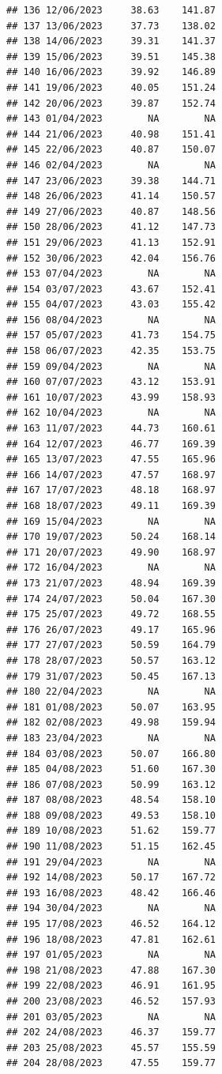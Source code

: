 \documentclass[
]{article}
\begin{document}
\begin{verbatim}
## 136 12/06/2023     38.63    141.87
## 137 13/06/2023     37.73    138.02
## 138 14/06/2023     39.31    141.37
## 139 15/06/2023     39.51    145.38
## 140 16/06/2023     39.92    146.89
## 141 19/06/2023     40.05    151.24
## 142 20/06/2023     39.87    152.74
## 143 01/04/2023        NA        NA
## 144 21/06/2023     40.98    151.41
## 145 22/06/2023     40.87    150.07
## 146 02/04/2023        NA        NA
## 147 23/06/2023     39.38    144.71
## 148 26/06/2023     41.14    150.57
## 149 27/06/2023     40.87    148.56
## 150 28/06/2023     41.12    147.73
## 151 29/06/2023     41.13    152.91
## 152 30/06/2023     42.04    156.76
## 153 07/04/2023        NA        NA
## 154 03/07/2023     43.67    152.41
## 155 04/07/2023     43.03    155.42
## 156 08/04/2023        NA        NA
## 157 05/07/2023     41.73    154.75
## 158 06/07/2023     42.35    153.75
## 159 09/04/2023        NA        NA
## 160 07/07/2023     43.12    153.91
## 161 10/07/2023     43.99    158.93
## 162 10/04/2023        NA        NA
## 163 11/07/2023     44.73    160.61
## 164 12/07/2023     46.77    169.39
## 165 13/07/2023     47.55    165.96
## 166 14/07/2023     47.57    168.97
## 167 17/07/2023     48.18    168.97
## 168 18/07/2023     49.11    169.39
## 169 15/04/2023        NA        NA
## 170 19/07/2023     50.24    168.14
## 171 20/07/2023     49.90    168.97
## 172 16/04/2023        NA        NA
## 173 21/07/2023     48.94    169.39
## 174 24/07/2023     50.04    167.30
## 175 25/07/2023     49.72    168.55
## 176 26/07/2023     49.17    165.96
## 177 27/07/2023     50.59    164.79
## 178 28/07/2023     50.57    163.12
## 179 31/07/2023     50.45    167.13
## 180 22/04/2023        NA        NA
## 181 01/08/2023     50.07    163.95
## 182 02/08/2023     49.98    159.94
## 183 23/04/2023        NA        NA
## 184 03/08/2023     50.07    166.80
## 185 04/08/2023     51.60    167.30
## 186 07/08/2023     50.99    163.12
## 187 08/08/2023     48.54    158.10
## 188 09/08/2023     49.53    158.10
## 189 10/08/2023     51.62    159.77
## 190 11/08/2023     51.15    162.45
## 191 29/04/2023        NA        NA
## 192 14/08/2023     50.17    167.72
## 193 16/08/2023     48.42    166.46
## 194 30/04/2023        NA        NA
## 195 17/08/2023     46.52    164.12
## 196 18/08/2023     47.81    162.61
## 197 01/05/2023        NA        NA
## 198 21/08/2023     47.88    167.30
## 199 22/08/2023     46.91    161.95
## 200 23/08/2023     46.52    157.93
## 201 03/05/2023        NA        NA
## 202 24/08/2023     46.37    159.77
## 203 25/08/2023     45.57    155.59
## 204 28/08/2023     47.55    159.77

\end{verbatim}
\end{document}
